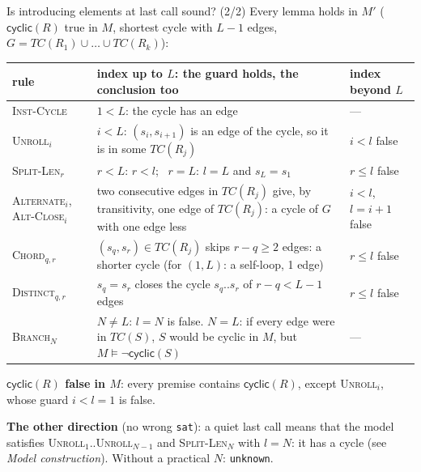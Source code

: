\documentclass[aspectratio=169]{beamer}
\newcommand{\sm}[1]{\texttt{#1}}
\newcommand{\TC}{\mathit{TC}}
\newcommand{\cyc}[1]{\mathsf{cyclic}(#1)}
\newcommand{\rn}[1]{\textsc{#1}}
\begin{document}
\begin{frame}{Is introducing elements at last call sound? (2/2)}
  \footnotesize
  Every lemma holds in $M'$ ($\cyc{R}$ true in $M$, shortest cycle with $L-1$ edges,
  $G = \TC(R_1)\cup\dots\cup\TC(R_k)$):
  \begin{center}
  \scriptsize\renewcommand{\arraystretch}{1.1}
  \begin{tabular}{@{}L{2.3cm}L{8.8cm}L{3.0cm}@{}}
    \toprule
    rule & index up to $L$: the guard holds, the conclusion too & index beyond $L$ \\
    \midrule
    \rn{Inst-Cycle} & $1 < L$: the cycle has an edge & --- \\
    \rn{Unroll}$_i$ & $i < L$: $(s_i,s_{i+1})$ is an edge of the cycle, so it is in some
      $\TC(R_j)$ & $i < l$ false \\
    \rn{Split-Len}$_r$ & $r < L$: $r < l$; \ $r = L$: $l = L$ and $s_L = s_1$ & $r \le l$ false \\
    \rn{Alternate}$_i$, \rn{Alt-Close}$_i$ & two consecutive edges in $\TC(R_j)$ give, by
      transitivity, one edge of $\TC(R_j)$: a cycle of $G$ with one edge less & $i<l$,
      $l=i+1$ false \\
    \rn{Chord}$_{q,r}$ & $(s_q,s_r)\in\TC(R_j)$ skips $r-q\ge 2$ edges: a shorter cycle (for
      $(1,L)$: a self-loop, 1 edge) & $r \le l$ false \\
    \rn{Distinct}$_{q,r}$ & $s_q = s_r$ closes the cycle $s_q..s_r$ of $r-q < L-1$ edges & $r \le l$
      false \\
    \rn{Branch}$_N$ & $N \ne L$: $l = N$ is false. $N = L$: if every edge were in $\TC(S)$,
      $S$ would be cyclic in $M$, but $M \models \neg\cyc{S}$ & --- \\
    \bottomrule
  \end{tabular}
  \end{center}
  \textbf{$\cyc{R}$ false in $M$}: every premise contains $\cyc{R}$, except \rn{Unroll}$_i$, whose
  guard $i < l = 1$ is false.
  \medskip

  \textbf{The other direction} (no wrong \sm{sat}): a quiet last call means that the model
  satisfies \rn{Unroll}$_1..$\rn{Unroll}$_{N-1}$ and \rn{Split-Len}$_N$ with $l = N$: it has a
  cycle (see \emph{Model construction}). Without a practical $N$: \sm{unknown}.
\end{frame}
\end{document}
